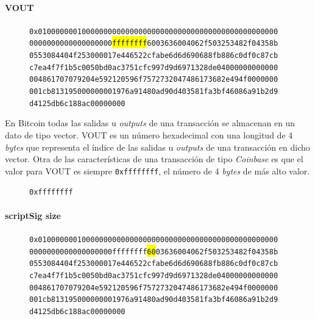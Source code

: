 \documentclass{article}
\begin{document}
    \paragraph{VOUT}
    
    \begin{figure}[H]
        \texttt{0x0100000001000000000000000000000000000000000000000000000} \\
        \texttt{0000000000000000000\colorbox{Yellow}{ffffffff}6003636004062f503253482f04358b} \\
        \texttt{0553084404f253000017e446522cfabe6d6d690688fb886c0df0c87cb} \\
        \texttt{c7ea4f7f1b5c0050bd0ac3751cfc997d9d6971328de04000000000000} \\
        \texttt{004861707079204e592120596f7572732047486173682e494f0000000} \\
        \texttt{001cb813195000000001976a91480ad90d403581fa3bf46086a91b2d9} \\
        \texttt{d4125db6c188ac00000000}
    \end{figure}
    
    En Bitcoin todas las salidas u \textit{outputs} de una transacción se almacenan en un dato de tipo vector. VOUT es un número hexadecimal con una longitud de 4 \textit{bytes} que representa el índice de las salidas u \textit{outputs} de una transacción en dicho vector. Otra de las características de una transacción de tipo \textit{Coinbase} es que el valor para VOUT es siempre \texttt{0xffffffff}, el número de 4 \textit{bytes} de más alto valor.
    \begin{figure}[H]
        \texttt{0xffffffff}
    \end{figure}
    
    \paragraph{scriptSig size}
    
    \begin{figure}[H]
        \texttt{0x0100000001000000000000000000000000000000000000000000000} \\
        \texttt{0000000000000000000ffffffff\colorbox{Yellow}{60}03636004062f503253482f04358b} \\
        \texttt{0553084404f253000017e446522cfabe6d6d690688fb886c0df0c87cb} \\
        \texttt{c7ea4f7f1b5c0050bd0ac3751cfc997d9d6971328de04000000000000} \\
        \texttt{004861707079204e592120596f7572732047486173682e494f0000000} \\
        \texttt{001cb813195000000001976a91480ad90d403581fa3bf46086a91b2d9} \\
        \texttt{d4125db6c188ac00000000}
    \end{figure}
    
\end{document}
